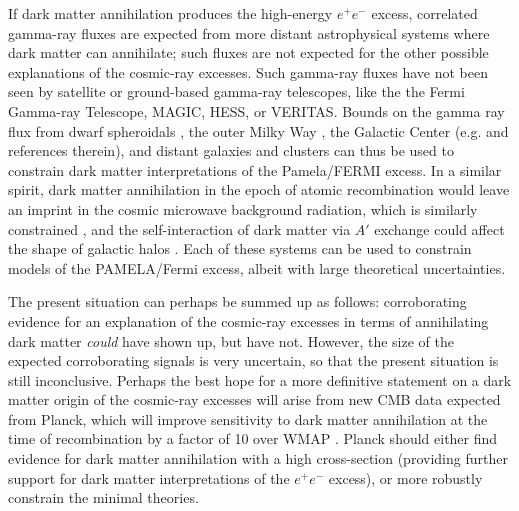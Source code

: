 If dark matter annihilation produces the high-energy $e^+e^-$ excess, correlated gamma-ray fluxes are expected from more distant astrophysical systems where dark matter can annihilate; such fluxes are not expected for the other possible explanations of the cosmic-ray excesses.  Such gamma-ray fluxes have not been seen by satellite or ground-based gamma-ray telescopes, like the the Fermi Gamma-ray Telescope, MAGIC, HESS, or VERITAS.  Bounds on the gamma ray flux from dwarf spheroidals \cite{Ackermann:2011wa}, the outer Milky Way \cite{DiffuseGalactic}, the Galactic Center (e.g. \cite{Papucci:2009gd,Hutsi:2010ai} and references therein), and distant galaxies \cite{Hutsi:2010ai,Zavala:2011tt} and clusters \cite{Huang:2011xr} can thus be used to constrain dark matter interpretations of the Pamela/FERMI excess.  
In a similar spirit, dark matter annihilation in the epoch of atomic recombination would leave an imprint in the cosmic microwave background radiation, which is similarly constrained \cite{CMBrefs}, and the self-interaction of dark matter via $A'$ exchange could affect the shape of galactic halos \cite{Feng:2009hw,Buckley:2009in}.  Each of these systems can be used to constrain models of the PAMELA/Fermi excess, albeit with large theoretical uncertainties.  

The present situation can perhaps be summed up as follows: corroborating evidence for an explanation of the cosmic-ray excesses 
in terms of annihilating dark matter 
\emph{could} have shown up, but have not.  However, the size of the expected corroborating signals is very uncertain, so that the 
present situation is still inconclusive. 
Perhaps the best hope for a more definitive statement on a dark matter origin of the cosmic-ray excesses will arise from new CMB data 
expected from Planck, which will improve sensitivity to dark matter annihilation at the time of recombination by a factor of 10 over WMAP \cite{CMBrefs}.  Planck should either find evidence for dark matter annihilation with a high cross-section (providing further support for dark matter interpretations of the $e^+e^-$ excess), or more robustly constrain the minimal theories.  


